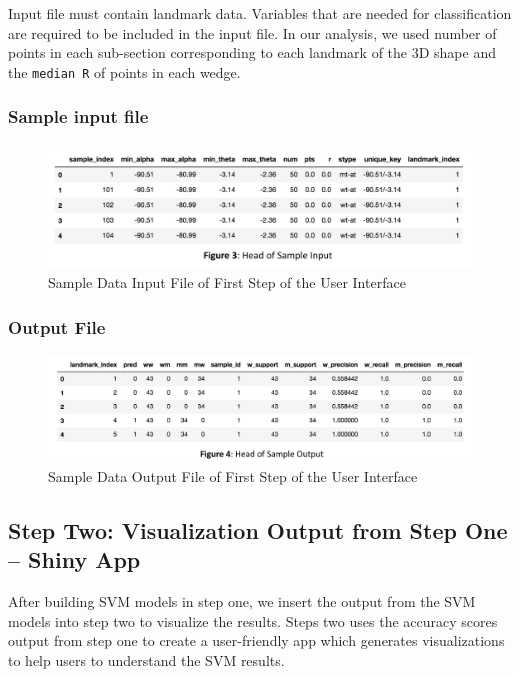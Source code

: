 \documentclass[10pt,letterpaper]{article}
\begin{document}
Input file must contain landmark data. Variables that are needed for
classification are required to be included in the input file. In our
analysis, we used number of points in each sub-section corresponding to
each landmark of the 3D shape and the \texttt{median\ R} of points in
each wedge.

\subsubsection{Sample input file}\label{sample-input-file}

\begin{figure}[h]
\includegraphics[width=5.11in]{figures/Figure3} \caption{Sample Data Input File of First Step of the User Interface}\label{fig:inputdata}
\end{figure}

\subsubsection{Output File}\label{output-file}

\begin{figure}[h]
\includegraphics[width=5.65in]{figures/Figure4} \caption{Sample Data Output File of First Step of the User Interface}\label{fig:outputdata}
\end{figure}

\subsection{Step Two: Visualization Output from Step One -- Shiny
App}\label{step-two-visualization-output-from-step-one-shiny-app}

After building SVM models in step one, we insert the output from the SVM
models into step two to visualize the results. Steps two uses the
accuracy scores output from step one to create a user-friendly app which
generates visualizations to help users to understand the SVM results.
\end{document}
